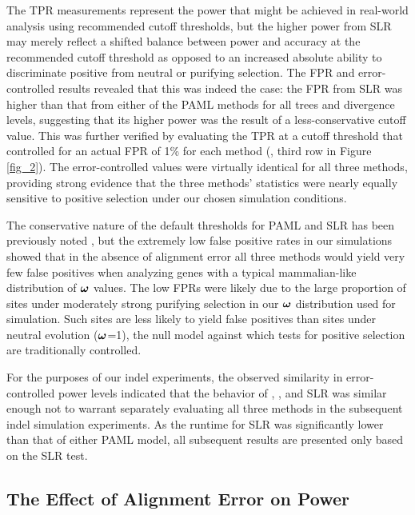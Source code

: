 \documentclass{article}
\begin{document}
The TPR measurements represent the power that might be achieved in
real-world analysis using recommended cutoff thresholds, but the
higher power from SLR may merely reflect a shifted balance between
power and accuracy at the recommended cutoff threshold as opposed to
an increased absolute ability to discriminate positive from neutral or
purifying selection. The FPR and error-controlled \tpr results
revealed that this was indeed the case: the FPR from SLR was higher
than that from either of the PAML methods for all trees and divergence
levels, suggesting that its higher power was the result of a
less-conservative cutoff value. This was further verified by
evaluating the TPR at a cutoff threshold that controlled for an actual
FPR of 1\% for each method (\tpr{}, third row in Figure
\ref{fig_2}). The error-controlled \tpr values were virtually
identical for all three methods, providing strong evidence that the
three methods' \sw statistics were nearly equally sensitive to
positive selection under our chosen simulation conditions.

The conservative nature of the default thresholds for PAML and SLR
has been previously noted
\citep{Anisimova2002Accuracy,Yang2005Bayes,Massingham2005Detecting},
but the extremely low false positive rates in our simulations showed
that in the absence of alignment error all three methods would yield
very few false positives when analyzing genes with a typical
mammalian-like distribution of $\bm{\omega}$ values. The low FPRs were likely
due to the large proportion of sites under moderately strong purifying
selection in our $\bm{\omega}$ distribution used for simulation. Such sites
are less likely to yield false positives than sites under neutral
evolution ($\bm{\omega}$=1), the null model against which tests for positive
selection are traditionally controlled.

For the purposes of our indel experiments, the observed similarity in
error-controlled power levels indicated that the behavior of \mtwo,
\meight, and SLR was similar enough not to warrant separately
evaluating all three methods in the subsequent indel simulation
experiments. As the runtime for SLR was significantly lower than that
of either PAML model, all subsequent results are presented only based
on the SLR test.

\subsection*{The Effect of Alignment Error on \Sw Power}
\end{document}
